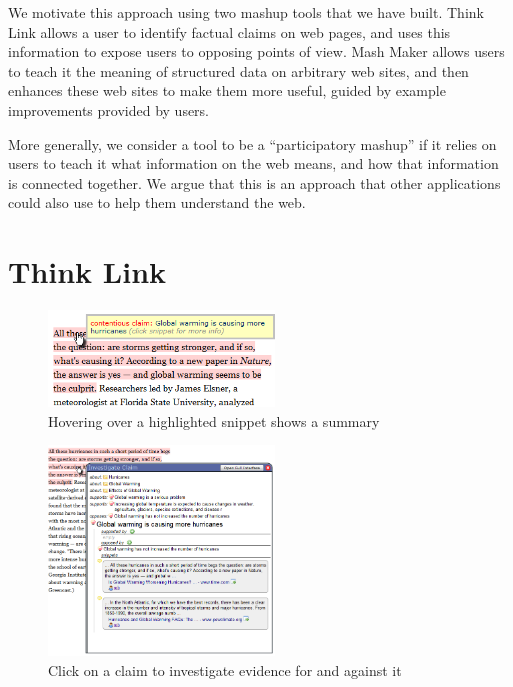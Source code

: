 \documentclass{chi2009}
\begin{document}
We motivate this approach using two mashup tools that we have built. Think Link allows a user to identify factual claims on web pages, and uses this information to expose users to opposing points of view. Mash Maker allows users to teach it the meaning of structured data on arbitrary web sites, and then enhances these web sites to make them more useful, guided by example improvements provided by users.

More generally, we consider a tool to be a ``participatory mashup'' if it relies on users to teach it what information on the web means, and how that information is connected together. We argue that this is an approach that other applications could also use to help them understand the web.

\section{Think Link}

\begin{figure}[tb]
	\begin{center}
	\includegraphics[width=6cm]{../screenshots/highlight_crop.png}
	\caption{Hovering over a highlighted snippet shows a summary}
	\label{highlight}
	\end{center}
\end{figure}

\begin{figure}[tb]
	\begin{center}
	\includegraphics[width=6cm]{../screenshots/claim_popup_crop2.png}
	\caption{Click on a claim to investigate evidence for and against it}
	\label{claimview}
	\end{center}
\end{figure}
\end{document}
